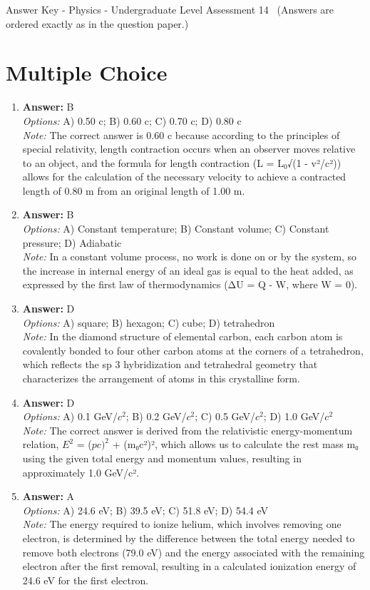 \documentclass[12pt]{article}
\begin{document}
\begin{center}
Answer Key - Physics - Undergraduate Level Assessment 14 \
\small (Answers are ordered exactly as in the question paper.)
\end{center}

\section*{Multiple Choice}
\begin{enumerate}[label=\arabic*.]
\item \textbf{Answer:} B
\\ \textit{Options:} A) 0.50 c; B) 0.60 c; C) 0.70 c; D) 0.80 c
\\ \textit{Note:} The correct answer is 0.60 c because according to the principles of special relativity, length contraction occurs when an observer moves relative to an object, and the formula for length contraction (L = L$_{0}$√(1 - v²/c²)) allows for the calculation of the necessary velocity to achieve a contracted length of 0.80 m from an original length of 1.00 m.
\item \textbf{Answer:} B
\\ \textit{Options:} A) Constant temperature; B) Constant volume; C) Constant pressure; D) Adiabatic
\\ \textit{Note:} In a constant volume process, no work is done on or by the system, so the increase in internal energy of an ideal gas is equal to the heat added, as expressed by the first law of thermodynamics (ΔU = Q - W, where W = 0).
\item \textbf{Answer:} D
\\ \textit{Options:} A) square; B) hexagon; C) cube; D) tetrahedron
\\ \textit{Note:} In the diamond structure of elemental carbon, each carbon atom is covalently bonded to four other carbon atoms at the corners of a tetrahedron, which reflects the sp 3 hybridization and tetrahedral geometry that characterizes the arrangement of atoms in this crystalline form.
\item \textbf{Answer:} D
\\ \textit{Options:} A) 0.1 GeV/$c^2$; B) 0.2 GeV/$c^2$; C) 0.5 GeV/$c^2$; D) 1.0 GeV/$c^2$
\\ \textit{Note:} The correct answer is derived from the relativistic energy-momentum relation, $E^2$ = ($pc)^2$ + (m₀c²)², which allows us to calculate the rest mass m₀ using the given total energy and momentum values, resulting in approximately 1.0 GeV/c².
\item \textbf{Answer:} A
\\ \textit{Options:} A) 24.6 eV; B) 39.5 eV; C) 51.8 eV; D) 54.4 eV
\\ \textit{Note:} The energy required to ionize helium, which involves removing one electron, is determined by the difference between the total energy needed to remove both electrons (79.0 eV) and the energy associated with the remaining electron after the first removal, resulting in a calculated ionization energy of 24.6 eV for the first electron.
\end{enumerate}
\end{document}
